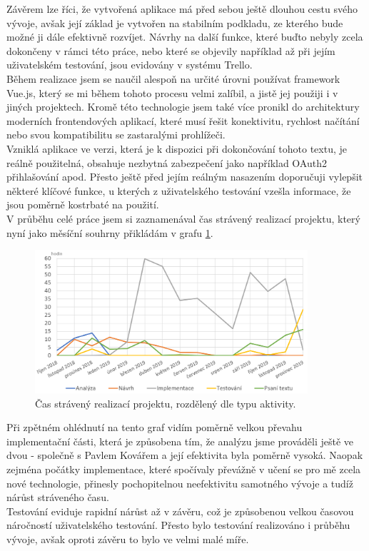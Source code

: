 \begin{conclusion} \label{conclusion}

Závěrem lze říci, že vytvořená aplikace má před sebou ještě dlouhou cestu svého vývoje, avšak její základ je vytvořen na stabilním podkladu, ze kterého bude možné ji dále efektivně rozvíjet. Návrhy na další funkce, které buďto nebyly zcela dokončeny v rámci této práce, nebo které se objevily například až při jejím uživatelském testování, jsou evidovány v systému Trello.\\
Během realizace jsem se naučil alespoň na určité úrovni používat framework Vue.js, který se mi během tohoto procesu velmi zalíbil, a jistě jej použiji i v jiných projektech. Kromě této technologie jsem také více pronikl do architektury moderních frontendových aplikací, které musí řešit konektivitu, rychlost načítání nebo svou kompatibilitu se zastaralými prohlížeči.\\
Vzniklá aplikace ve verzi, která je k dispozici při dokončování tohoto textu, je reálně použitelná, obsahuje nezbytná zabezpečení jako například OAuth2 přihlašování apod. Přesto ještě před jejím reálným nasazením doporučuji vylepšit některé klíčové funkce, u kterých z uživatelského testování vzešla informace, že jsou poměrně kostrbaté na použití.\\
V průběhu celé práce jsem si zaznamenával čas strávený realizací projektu, který nyní jako měsíční souhrny přikládám v grafu \ref{picture:time:spent}.

\begin{figure}[H]
\includegraphics[width=0.9\textwidth]{../png/time/time_spent.png}
\caption[Měsíční čas strávený realizací projektu]{Čas strávený realizací projektu, rozdělený dle typu aktivity.} \label{picture:time:spent}
\end{figure}

Při zpětném ohlédnutí na tento graf vidím poměrně velkou převahu implementační části, která je způsobena tím, že analýzu jsme prováděli ještě ve dvou - společně s Pavlem Kovářem a její efektivita byla poměrně vysoká. Naopak zejména počátky implementace, které spočívaly převážně v učení se pro mě zcela nové technologie, přinesly pochopitelnou neefektivitu samotného vývoje a tudíž nárůst stráveného času.\\ Testování eviduje rapidní nárůst až v závěru, což je způsobenou velkou časovou náročností uživatelského testování. Přesto bylo testování realizováno i průběhu vývoje, avšak oproti závěru to bylo ve velmi malé míře.

\end{conclusion}
